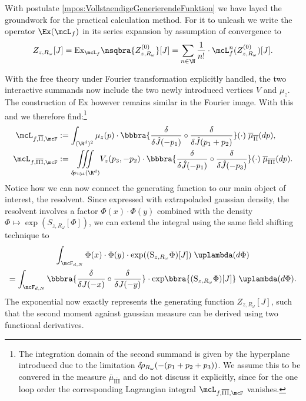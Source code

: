 With postulate \eqref{mpos:VollstaendigeGenerierendeFunktion} we have layed the groundwork for the practical calculation method. For it to unleash we write the operator $\Ex(\mcL_f)$ in its series expansion by assumption of convergence to 
\[
    Z_{z,R_\omega}[J] = \text{Ex}_{\mcL_f}\nsqbra{Z_{z,R_\omega}^{(0)}}[J] = \sum_{n\in\N} \frac{1}{n!}\cdot\mcL_f^n(Z_{z,R_\omega}^{(0)})[J].
\]


% 
With the free theory under Fourier transformation explicitly handled, the two interactive summands now include the two newly introduced vertices $V$ and $\mu_z$. 
The construction of $\text{Ex}$ however remains similar in the Fourier image. 
With this and \cite{mth:vogel} we therefore find:\footnote{The integration domain of the second summand is given by the hyperplane introduced due to the limitation $\delta\hspace*{-0.15em}\rho_{R_\omega}(-(p_1 + p_2 + p_3))$. We assume this to be convered in the measure $\overline\mu_{\overline{\text{III}}}$ and do not discuss it explicitly, since for the one loop order the corresponding Lagrangian integral $\mcL_{f,\overline{\text{III}},\mcF}$ vanishes.}
\begin{align*}
    \mcL_{f,\overline{\text{II}},\mcF} &:= \int_{(\R^d)^2}\mu_z(p)\cdot\bbbra{\frac{\delta}{\delta\hat J(-p_1)}\circ\frac{\delta}{\delta\hat J(p_1+p_2)}}(\cdot)\;\overline\mu_{\overline{\text{II}}}(dp), \\
    \mcL_{f,\overline{\text{III}},\mcF} &:= \underset{\drho_{134}(\R^d)}{\iiint} V_z(p_3,-p_2)\cdot\bbbra{\frac{\delta}{\delta\hat J(-p_1)}\circ \frac{\delta}{\delta\hat J(-p_3)}}(\cdot)\;\overline\mu_{\overline{\text{III}}}(dp).
\end{align*}
Notice how we can now connect the generating function to our main object of interest, the resolvent. Since expressed with extrapoladed gaussian density, the resolvent involves a factor $\Phi(x)\cdot\Phi(y)$ combined with the density $\Phi\mapsto \exp(S_{z,R_\omega}[\Phi])$, we can extend the integral using the same field shifting technique to 
\begin{multline}
    \int_{\mcF_{d,N}}\Phi(x)\cdot\Phi(y)\cdot \exp((\text{S}_{z,R_\omega}\Phi)[J])\;\uplambda(d\Phi) \\
    = \int_{\mcF_{d,N}}\bbbra{\frac{\delta}{\delta J(-x)}\circ\frac{\delta}{\delta J(-y)}}\cdot{\exp}\bbra{(\text{S}_{z,R_\omega}\Phi)[J]}\;\uplambda(d\Phi).
    \label{eq:GeneratedSecondMomentIntegral}
\end{multline}
The exponential now exactly represents the generating function $Z_{z,R_\omega}[J]$, such that the second moment against gaussian measure can be derived using two functional derivatives.


